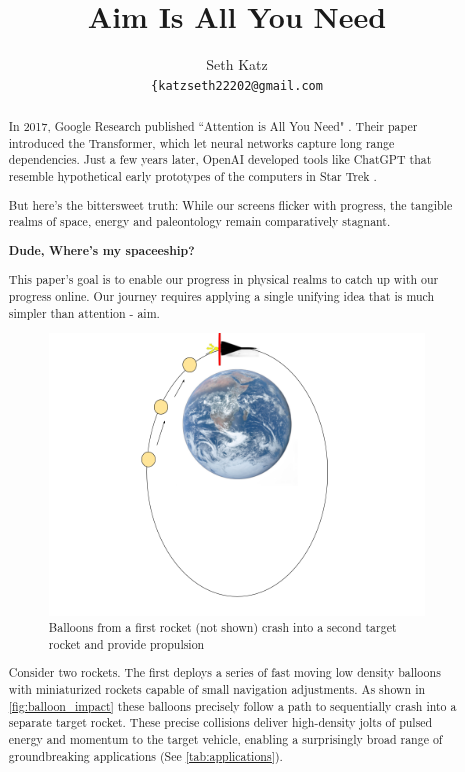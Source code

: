 \documentclass{article}
\title{Aim Is All You Need}
\author{
  Seth Katz \\
  \texttt{\{katzseth22202@gmail.com} \\
}
\begin{document}
\maketitle

\begin{abstract}\label{sec:abstract}
 In 2017, Google Research published ``Attention is All You Need" \cite{vaswani2023attentionneed}.  Their paper introduced the Transformer, which let neural networks capture long range dependencies.   Just a few years later, OpenAI developed tools like ChatGPT \cite{chatgpt} that resemble hypothetical early prototypes of the computers in Star Trek \cite{startrek}.

But here's the bittersweet truth:  While our screens flicker with progress, the tangible realms of space, energy and paleontology remain comparatively stagnant.

\textbf{Dude, Where's my spaceeship?}

This paper's goal is to enable our progress in physical realms to catch up with our progress online.  Our journey requires applying a single unifying idea that is much simpler than attention - aim.   \begin{figure}[htpb]
    \centering
    \includegraphics[width=0.5\linewidth]{images/Starship_Impact_ellipse.png}
    \caption{Balloons from a first rocket (not shown) crash into a second target rocket and provide propulsion \cite{earth_image}}
    \label{fig:balloon_impact}
\end{figure}

Consider two rockets.   The first deploys a series of fast moving low density balloons with miniaturized rockets capable of small navigation adjustments.  As shown in \autoref{fig:balloon_impact} these balloons precisely follow a path to sequentially crash  into a separate  target rocket.   These precise collisions deliver high-density jolts of pulsed energy and momentum to the target vehicle, enabling a surprisingly broad range of groundbreaking applications (See \autoref{tab:applications}).    


\end{abstract}
\end{document}
